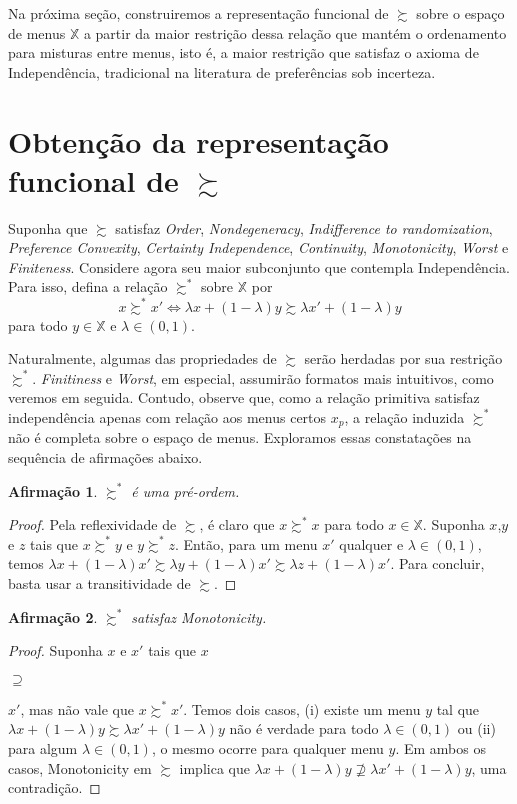\documentclass[11pt, a4paper]{article}
\theoremstyle{nonumberplain}
\newtheorem{proof}{Dem.}
\theoremstyle{plain}
\newtheorem{claim}{Afirmação}
\theoremstyle{plain}
\begin{document}
Na próxima seção, construiremos a representação funcional de $\succsim$ sobre o espaço de menus $\mathbb{X}$ a partir da maior restrição dessa relação que mantém o ordenamento para misturas entre menus, isto é, a maior restrição que satisfaz o axioma de Independência, tradicional na literatura de preferências sob incerteza. 

\section{Obtenção da representação funcional de $\succsim$}

Suponha que $\succsim$ satisfaz \textit{Order}, \textit{Nondegeneracy}, \textit{Indifference to randomization}, \textit{Preference Convexity}, \textit{Certainty Independence}, \textit{Continuity}, \textit{Monotonicity}, \textit{Worst} e \textit{Finiteness}. Considere agora seu maior subconjunto que contempla Independência. Para isso, defina a relação $\succsim^*$ sobre $\mathbb{X}$ por $$x\succsim^* x' \Leftrightarrow \lambda x + (1-\lambda)y \succsim \lambda x' + (1-\lambda)y$$ para todo $y\in \mathbb{X}$ e $\lambda\in(0,1)$.

Naturalmente, algumas das propriedades de $\succsim$ serão herdadas por sua restrição $\succsim^*$. \textit{Finitiness} e \textit{Worst}, em especial, assumirão formatos mais intuitivos, como veremos em seguida. Contudo, observe que, como a relação primitiva satisfaz independência apenas com relação aos menus certos $x_p$, a relação induzida $\succsim^*$ não é completa sobre o espaço de menus. Exploramos essas constatações na sequência de afirmações abaixo.


\begin{claim}$\succsim^*$ é uma pré-ordem. \end{claim}
\begin{proof} Pela reflexividade de $\succsim$, é claro que $x\succsim^* x$ para todo $x\in \mathbb{X}$. Suponha $x$,$y$ e $z$ tais que $x\succsim^* y$ e $y\succsim^* z$. Então, para um menu $x'$ qualquer e $\lambda\in(0,1)$, temos $\lambda x + (1-\lambda)x'\succsim \lambda y + (1-\lambda)x'\succsim \lambda z + (1-\lambda)x'$. Para concluir, basta usar a transitividade de $\succsim$.
\end{proof}


\begin{claim}$\succsim^*$ satisfaz Monotonicity. \end{claim}
\begin{proof}
Suponha $x$ e $x'$ tais que $x$\begin{small}$\supseteq$\end{small}$x'$, mas não vale que $x\succsim^* x'$. Temos dois casos, (i) existe um menu $y$ tal que $\lambda x + (1-\lambda)y\succsim \lambda x' + (1-\lambda)y$ não é verdade para todo $\lambda\in(0,1)$ ou (ii) para algum $\lambda\in(0,1)$, o mesmo ocorre para qualquer menu $y$. Em ambos os casos, Monotonicity em $\succsim$ implica que $\lambda x + (1-\lambda)y \nsupseteq \lambda x' + (1-\lambda)y$, uma contradição.   
\end{proof}
\end{document}
